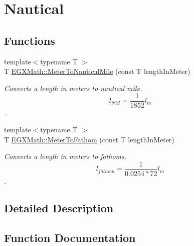 \hypertarget{group___e_g_x_math-_conversions-_length_conversions-_s_i-_meter-_nautical}{}\section{Nautical}
\label{group___e_g_x_math-_conversions-_length_conversions-_s_i-_meter-_nautical}
\subsection*{Functions}
\begin{DoxyCompactItemize}
\item 
{\footnotesize template$<$typename T $>$ }\\T \mbox{\hyperlink{group___e_g_x_math-_conversions-_length_conversions-_s_i-_meter-_nautical_ga501f0dd53cb3c21d377eac2a18fabdf8}{E\+G\+X\+Math\+::\+Meter\+To\+Nautical\+Mile}} (const T length\+In\+Meter)
\begin{DoxyCompactList}\small\item\em Converts a length in meters to nautical mile. \[ l_{NM}= \frac{1}{1852} l_{m} \]. \end{DoxyCompactList}\item 
{\footnotesize template$<$typename T $>$ }\\T \mbox{\hyperlink{group___e_g_x_math-_conversions-_length_conversions-_s_i-_meter-_nautical_gaa66945d01b3da25cb9d52cd15f4aa38e}{E\+G\+X\+Math\+::\+Meter\+To\+Fathom}} (const T length\+In\+Meter)
\begin{DoxyCompactList}\small\item\em Converts a length in meters to fathoms. \[ l_{fathom}= \frac{1}{0.0254 * 72} l_{m} \]. \end{DoxyCompactList}\end{DoxyCompactItemize}


\subsection{Detailed Description}


\subsection{Function Documentation}
\mbox{\label{group___e_g_x_math-_conversions-_length_conversions-_s_i-_meter-_nautical_gaa66945d01b3da25cb9d52cd15f4aa38e}} 

